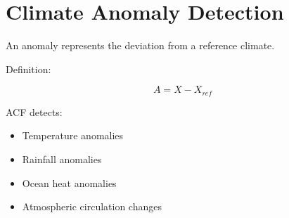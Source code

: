 \section{Climate Anomaly Detection}


An anomaly represents the deviation from a reference climate.



Definition:


\begin{equation}
A=X-X_{ref}
\end{equation}



ACF detects:


\begin{itemize}

\item Temperature anomalies

\item Rainfall anomalies

\item Ocean heat anomalies

\item Atmospheric circulation changes

\end{itemize}
